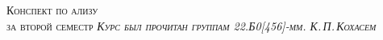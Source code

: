 \begin{titlepage}
    \begin{center}
        \vspace*{3cm}
        \scshape \HUGE Конспект по \logo ализу \\ \LARGE за второй семестр
        \vfill
        \slshape \Large Курс был прочитан группам 22.Б0[456]-мм. К.\,П.\,Кохасем
    \end{center}
\end{titlepage}